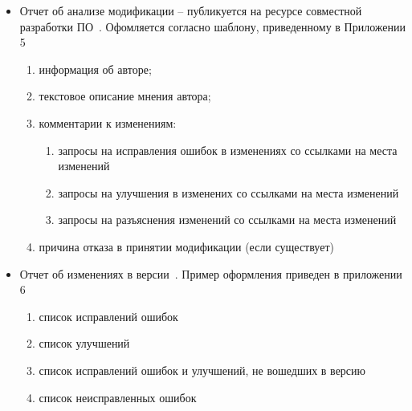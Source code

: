 \begin{itemize}
    \item Отчет об анализе модификации -- публикуется на ресурсе совместной разработки ПО~\cite{qemupatchew}.
    Офомляется согласно шаблону, приведенному в Приложении 5
    \begin{enumerate}
        \item информация об авторе;
        \item текстовое описание мнения автора;
        \item комментарии к изменениям:
        \begin{enumerate}
            \item запросы на исправления ошибок в изменениях со ссылками на места изменений
            \item запросы на улучшения в изменених со ссылками на места изменений
            \item запросы на разъяснения изменений со ссылками на места изменений
        \end{enumerate}
        \item причина отказа в принятии модификации (если существует)
    \end{enumerate}


    \item Отчет об изменениях в версии~\cite{qemu}.
    Пример оформления приведен в приложении 6
    \begin{enumerate}
        \item список исправлений ошибок
        \item список улучшений
        \item список исправлений ошибок и улучшений, не вошедших в версию
        \item список неисправленных ошибок
    \end{enumerate}
\end{itemize}

